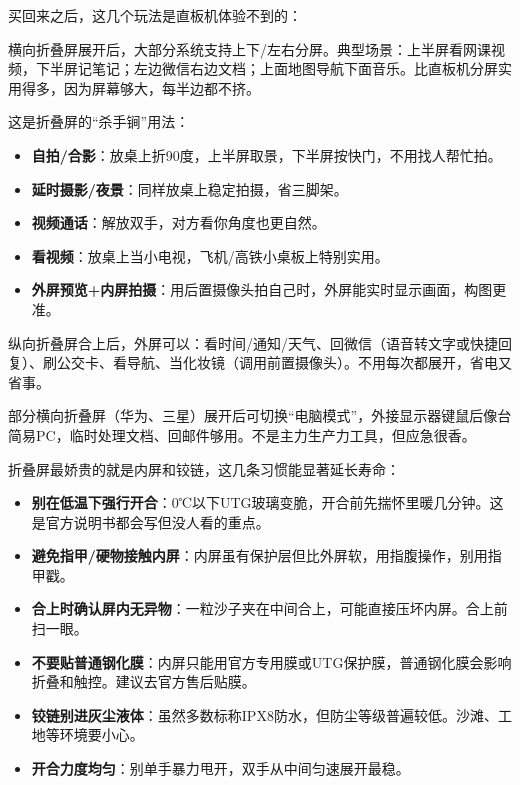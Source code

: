 
买回来之后，这几个玩法是直板机体验不到的：


横向折叠屏展开后，大部分系统支持上下/左右分屏。典型场景：上半屏看网课视频，下半屏记笔记；左边微信右边文档；上面地图导航下面音乐。比直板机分屏实用得多，因为屏幕够大，每半边都不挤。


这是折叠屏的“杀手锏”用法：

\begin{itemize}
  \item \textbf{自拍/合影}：放桌上折90度，上半屏取景，下半屏按快门，不用找人帮忙拍。
  \item \textbf{延时摄影/夜景}：同样放桌上稳定拍摄，省三脚架。
  \item \textbf{视频通话}：解放双手，对方看你角度也更自然。
  \item \textbf{看视频}：放桌上当小电视，飞机/高铁小桌板上特别实用。
  \item \textbf{外屏预览+内屏拍摄}：用后置摄像头拍自己时，外屏能实时显示画面，构图更准。
\end{itemize}


纵向折叠屏合上后，外屏可以：看时间/通知/天气、回微信（语音转文字或快捷回复）、刷公交卡、看导航、当化妆镜（调用前置摄像头）。不用每次都展开，省电又省事。


部分横向折叠屏（华为、三星）展开后可切换“电脑模式”，外接显示器键鼠后像台简易PC，临时处理文档、回邮件够用。不是主力生产力工具，但应急很香。


折叠屏最娇贵的就是内屏和铰链，这几条习惯能显著延长寿命：

\begin{itemize}
  \item \textbf{别在低温下强行开合}：0℃以下UTG玻璃变脆，开合前先揣怀里暖几分钟。这是官方说明书都会写但没人看的重点。
  \item \textbf{避免指甲/硬物接触内屏}：内屏虽有保护层但比外屏软，用指腹操作，别用指甲戳。
  \item \textbf{合上时确认屏内无异物}：一粒沙子夹在中间合上，可能直接压坏内屏。合上前扫一眼。
  \item \textbf{不要贴普通钢化膜}：内屏只能用官方专用膜或UTG保护膜，普通钢化膜会影响折叠和触控。建议去官方售后贴膜。
  \item \textbf{铰链别进灰尘液体}：虽然多数标称IPX8防水，但防尘等级普遍较低。沙滩、工地等环境要小心。
  \item \textbf{开合力度均匀}：别单手暴力甩开，双手从中间匀速展开最稳。
\end{itemize}

